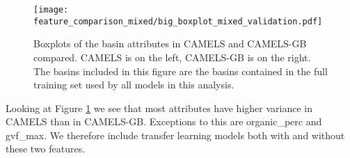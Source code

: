 \begin{figure}
    \centering
    \texttt{[image: feature\_comparison\_mixed/big\_boxplot\_mixed\_validation.pdf]}
    \caption{Boxplots of the basin attributes in CAMELS and CAMELS-GB compared. 
    CAMELS is on the left, CAMELS-GB is on the right. The basins included in this 
    figure are the basins contained in the full training set used by all models 
    in this analysis.}
    \label{attribute comparison}
\end{figure}
Looking at Figure \ref{attribute comparison} we see that most attributes have higher 
variance in CAMELS than in CAMELS-GB. Exceptions to this are organic\_perc and gvf\_max. 
We therefore include transfer learning models both with and without these two features.
